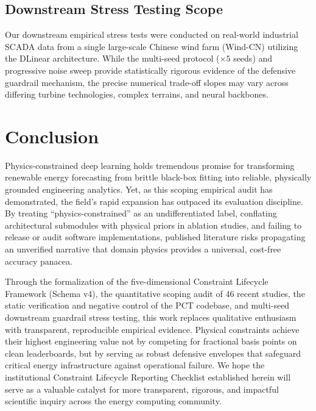 \documentclass[preprint,3p,times]{elsarticle}
\begin{document}
\subsection{Downstream Stress Testing Scope}
Our downstream empirical stress tests were conducted on real-world industrial SCADA data from a single large-scale Chinese wind farm (Wind-CN) utilizing the DLinear architecture. While the multi-seed protocol ($\times 5$ seeds) and progressive noise sweep provide statistically rigorous evidence of the defensive guardrail mechanism, the precise numerical trade-off slopes may vary across differing turbine technologies, complex terrains, and neural backbones.

\section{Conclusion}
\label{sec:conclusion}

Physics-constrained deep learning holds tremendous promise for transforming renewable energy forecasting from brittle black-box fitting into reliable, physically grounded engineering analytics. Yet, as this scoping empirical audit has demonstrated, the field's rapid expansion has outpaced its evaluation discipline. By treating ``physics-constrained'' as an undifferentiated label, conflating architectural submodules with physical priors in ablation studies, and failing to release or audit software implementations, published literature risks propagating an unverified narrative that domain physics provides a universal, cost-free accuracy panacea.

Through the formalization of the five-dimensional Constraint Lifecycle Framework (Schema v4), the quantitative scoping audit of 46 recent studies, the static verification and negative control of the PCT codebase, and multi-seed downstream guardrail stress testing, this work replaces qualitative enthusiasm with transparent, reproducible empirical evidence. Physical constraints achieve their highest engineering value not by competing for fractional basis points on clean leaderboards, but by serving as robust defensive envelopes that safeguard critical energy infrastructure against operational failure. We hope the institutional Constraint Lifecycle Reporting Checklist established herein will serve as a valuable catalyst for more transparent, rigorous, and impactful scientific inquiry across the energy computing community.
\end{document}
